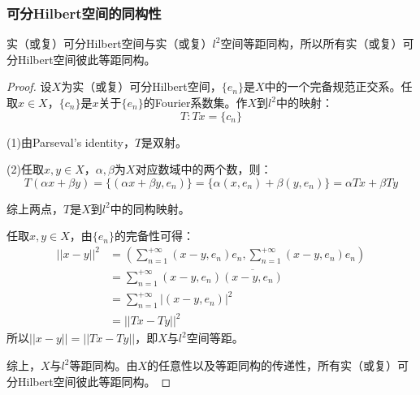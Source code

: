 \subsubsection{可分Hilbert空间的同构性}
\begin{theorem}
	实（或复）可分Hilbert空间与实（或复）$l^2$空间等距同构，所以所有实（或复）可分Hilbert空间彼此等距同构。
\end{theorem}
\begin{proof}
	设$X$为实（或复）可分Hilbert空间，$\{e_n\}$是$X$中的一个完备规范正交系。任取$x\in X$，$\{c_n\}$是$x$关于$\{e_n\}$的Fourier系数集。作$X$到$l^2$中的映射：
	\begin{equation*}
		T:Tx=\{c_n\}
	\end{equation*}\par
	(1)由Parseval's identity，$T$是双射。\par
	(2)任取$x,y\in X$，$\alpha,\beta$为$X$对应数域中的两个数，则：
	\begin{equation*}
		T(\alpha x+\beta y)=\{(\alpha x+\beta y,e_n)\}=\{\alpha(x,e_n)+\beta(y,e_n)\}=\alpha Tx+\beta Ty
	\end{equation*}\par
	综上两点，$T$是$X$到$l^2$中的同构映射。\par
	任取$x,y\in X$，由$\{e_n\}$的完备性可得：
	\begin{align*}
		||x-y||^2
		&=\left(\sum_{n=1}^{+\infty}(x-y,e_n)e_n,\sum_{n=1}^{+\infty}(x-y,e_n)e_n\right) \\
		&=\sum_{n=1}^{+\infty}(x-y,e_n)\overline{(x-y,e_n)} \\
		&=\sum_{n=1}^{+\infty}|(x-y,e_n)|^2 \\
		&=||Tx-Ty||^2
	\end{align*}
	所以$||x-y||=||Tx-Ty||$，即$X$与$l^2$空间等距。\par
	综上，$X$与$l^2$等距同构。由$X$的任意性以及等距同构的传递性，所有实（或复）可分Hilbert空间彼此等距同构。
\end{proof}